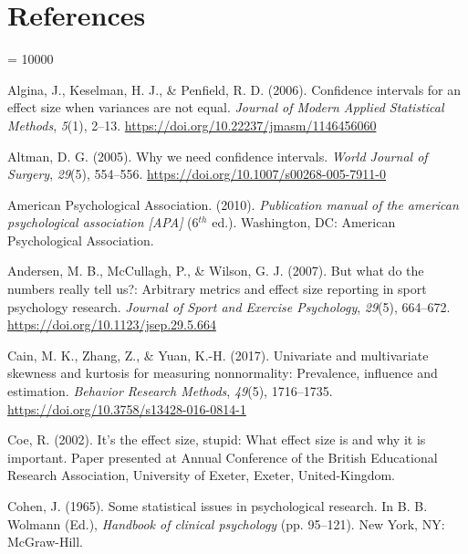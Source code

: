\documentclass[
  english,
  man,floatsintext]{apa6}
\newlength{\cslhangindent}
\newlength{\cslentryspacingunit} %
\newenvironment{CSLReferences}[2] %
 {%
  \setlength{\parindent}{0pt}
  \ifodd #1
  \let\oldpar\par
  \def\par{\hangindent=\cslhangindent\oldpar}
  \fi
  \setlength{\parskip}{#2\cslentryspacingunit}
 }%
 {}
\begin{document}
\hypertarget{references}{%
\section{References}\label{references}}

\begingroup

\interlinepenalty = 10000

\hypertarget{refs}{}
\begin{CSLReferences}{1}{0}
\leavevmode{}%
Algina, J., Keselman, H. J., \& Penfield, R. D. (2006). Confidence intervals for an effect size when variances are not equal. \emph{Journal of Modern Applied Statistical Methods}, \emph{5}(1), 2--13. \url{https://doi.org/10.22237/jmasm/1146456060}

\leavevmode{}%
Altman, D. G. (2005). Why we need confidence intervals. \emph{World {J}ournal of {S}urgery}, \emph{29}(5), 554--556. \url{https://doi.org/10.1007/s00268-005-7911-0}

\leavevmode{}%
American Psychological Association. (2010). \emph{Publication manual of the american psychological association {[}{APA}{]}} (6\(^{th}\) ed.). Washington, {DC}: American Psychological Association.

\leavevmode{}%
Andersen, M. B., McCullagh, P., \& Wilson, G. J. (2007). But what do the numbers really tell us?: Arbitrary metrics and effect size reporting in sport psychology research. \emph{Journal of {S}port and {E}xercise {P}sychology}, \emph{29}(5), 664--672. \url{https://doi.org/10.1123/jsep.29.5.664}

\leavevmode{}%
Cain, M. K., Zhang, Z., \& Yuan, K.-H. (2017). Univariate and multivariate skewness and kurtosis for measuring nonnormality: Prevalence, influence and estimation. \emph{Behavior {R}esearch {M}ethods}, \emph{49}(5), 1716--1735. \url{https://doi.org/10.3758/s13428-016-0814-1}

\leavevmode{}%
Coe, R. (2002). It's the effect size, stupid: What effect size is and why it is important. Paper presented at Annual Conference of the {B}ritish {E}ducational {R}esearch {A}ssociation, University of Exeter, Exeter, {U}nited-{K}ingdom.

\leavevmode{}%
Cohen, J. (1965). Some statistical issues in psychological research. In B. B. Wolmann (Ed.), \emph{Handbook of clinical psychology} (pp. 95--121). New York, NY: McGraw-Hill.


\end{CSLReferences}
\end{document}
